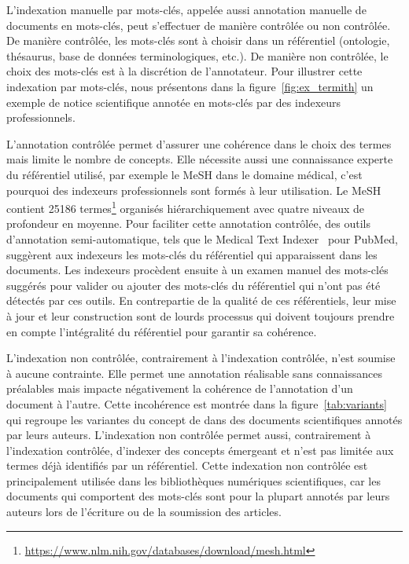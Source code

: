 L'indexation manuelle par mots-clés, appelée aussi annotation manuelle de documents en mots-clés, peut s'effectuer de manière contrôlée ou non contrôlée.
De manière contrôlée, les mots-clés sont à choisir dans un référentiel (ontologie, thésaurus, base de données terminologiques, etc.). De manière non contrôlée, le choix des mots-clés est à la discrétion de l'annotateur.
Pour illustrer cette indexation par mots-clés, nous présentons dans la figure~\ref{fig:ex_termith} un exemple de notice scientifique annotée en mots-clés par des indexeurs professionnels.



L'annotation contrôlée permet d'assurer une cohérence dans le choix des termes mais limite le nombre de concepts. Elle nécessite aussi une connaissance experte du référentiel utilisé, par exemple le MeSH dans le domaine médical, c'est pourquoi des indexeurs professionnels sont formés à leur utilisation. Le MeSH contient \num{25 186} termes\footnote{\url{https://www.nlm.nih.gov/databases/download/mesh.html}} organisés hiérarchiquement avec quatre niveaux de profondeur en moyenne.
%
%
Pour faciliter cette annotation contrôlée, des outils d'annotation semi-automatique, tels que le Medical Text Indexer~\cite{mork_nlm_2013} pour PubMed, suggèrent aux indexeurs les mots-clés du référentiel qui apparaissent dans les documents.
Les indexeurs procèdent ensuite à un examen manuel des mots-clés suggérés pour valider ou ajouter des mots-clés du référentiel qui n'ont pas été détectés par ces outils.
%
En contrepartie de la qualité de ces référentiels, leur mise à jour et leur construction sont de lourds processus qui doivent toujours prendre en compte l'intégralité du référentiel pour garantir sa cohérence. %

L'indexation non contrôlée, contrairement à l'indexation contrôlée, n'est soumise à aucune contrainte. Elle permet une annotation réalisable sans connaissances préalables mais impacte négativement la cohérence de l'annotation d'un document à l'autre. Cette incohérence est montrée dans la figure~\ref{tab:variants} qui regroupe les variantes du concept de  dans des documents scientifiques annotés par leurs auteurs.
L'indexation non contrôlée permet aussi, contrairement à l'indexation contrôlée, d'indexer des concepts émergeant et n'est pas limitée aux termes déjà identifiés par un référentiel.
Cette indexation non contrôlée est principalement utilisée dans les bibliothèques numériques scientifiques, car les documents qui comportent des mots-clés sont pour la plupart annotés par leurs auteurs lors de l'écriture ou de la soumission des articles.

